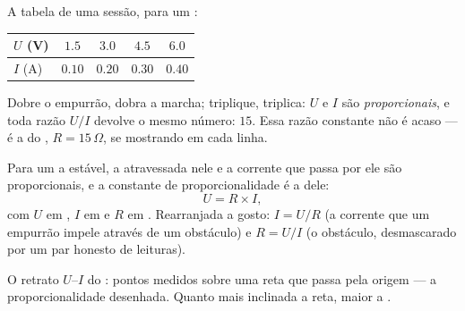 \begin{example}\label{ex:g8:ohms-law:confession}
A tabela de uma sessão, para um :
\begin{center}
\begin{tabular}{l|cccc}
$U$ (\unit{V}) & $1.5$ & $3.0$ & $4.5$ & $6.0$ \\
\hline
$I$ (\unit{A}) & $0.10$ & $0.20$ & $0.30$ & $0.40$
\end{tabular}
\end{center}
Dobre o empurrão, dobra a marcha; triplique, triplica: $U$ e $I$ são
\emph{proporcionais}, e toda razão $U/I$ devolve o mesmo número:
$15$. Essa razão constante não é acaso --- é a  do
, $R = 15\,\Omega$, se mostrando em cada linha.
\end{example}

\begin{proposition}\label{prop:g8:ohms-law:law}
Para um  a  estável, a  atravessada nele e a
corrente que passa por ele são proporcionais, e a constante de
proporcionalidade é a  dele:
\[
U = R \times I ,
\]
com $U$ em , $I$ em  e $R$ em . Rearranjada a gosto:
$I = U/R$ (a corrente que um empurrão impele através de um obstáculo)
e $R = U/I$ (o obstáculo, desmascarado por um par honesto de
leituras).
\end{proposition}

\begin{omfigure}

{\small O retrato $U$--$I$ do : pontos medidos sobre uma reta
que passa pela origem --- a proporcionalidade desenhada. Quanto mais
inclinada a reta, maior a .}
\end{omfigure}

